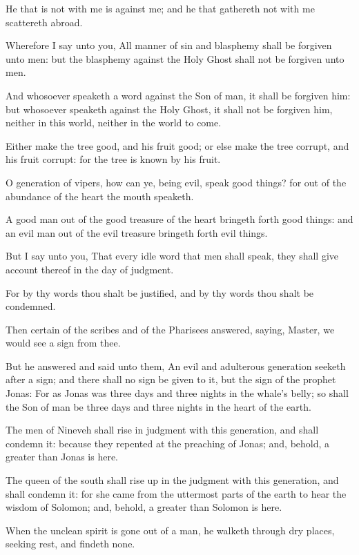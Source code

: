 \verse He that is not with me is against me; and he that gathereth not with me scattereth abroad.

\verse Wherefore I say unto you, All manner of sin and blasphemy shall be forgiven unto men: but the blasphemy against the Holy Ghost shall not be forgiven unto men.

\verse And whosoever speaketh a word against the Son of man, it shall be forgiven him: but whosoever speaketh against the Holy Ghost, it shall not be forgiven him, neither in this world, neither in the world to come.

\verse Either make the tree good, and his fruit good; or else make the tree corrupt, and his fruit corrupt: for the tree is known by his fruit.

\verse O generation of vipers, how can ye, being evil, speak good things?  for out of the abundance of the heart the mouth speaketh.

\verse A good man out of the good treasure of the heart bringeth forth good things: and an evil man out of the evil treasure bringeth forth evil things.

\verse But I say unto you, That every idle word that men shall speak, they shall give account thereof in the day of judgment.

\verse For by thy words thou shalt be justified, and by thy words thou shalt be condemned.

\verse Then certain of the scribes and of the Pharisees answered, saying, Master, we would see a sign from thee.

\verse But he answered and said unto them, An evil and adulterous generation seeketh after a sign; and there shall no sign be given to it, but the sign of the prophet Jonas: \verse For as Jonas was three days and three nights in the whale's belly; so shall the Son of man be three days and three nights in the heart of the earth.

\verse The men of Nineveh shall rise in judgment with this generation, and shall condemn it: because they repented at the preaching of Jonas; and, behold, a greater than Jonas is here.

\verse The queen of the south shall rise up in the judgment with this generation, and shall condemn it: for she came from the uttermost parts of the earth to hear the wisdom of Solomon; and, behold, a greater than Solomon is here.

\verse When the unclean spirit is gone out of a man, he walketh through dry places, seeking rest, and findeth none.

